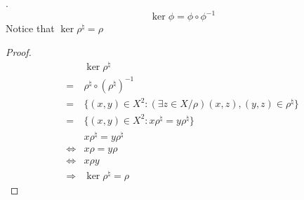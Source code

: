 \begin{Def}.
    \[\ker \phi =\phi \circ \phi^{-1}\]
    Notice that $\ker \rho^{\natural} =\rho $ 
    \begin{proof}
        \begin{align*}
            & \ker \rho^{\natural}  \\
            =& \rho^{\natural} \circ (\rho^{\natural})^{-1} \\
            =& \{(x,y)\in X^2:(\exists z\in X/\rho)(x,z),(y,z)\in \rho^{\natural}\}    \\
            =& \{(x,y)\in X^2:x\rho^{\natural}=y\rho^{\natural}\}   \\
            & x\rho^{\natural} = y\rho^{\natural}   \\
            \Leftrightarrow& x\rho = y\rho  \\
            \Leftrightarrow& x\rho y    \\
            \Rightarrow& \ker \rho^{\natural} = \rho
        \end{align*}
    \end{proof}
\end{Def}

